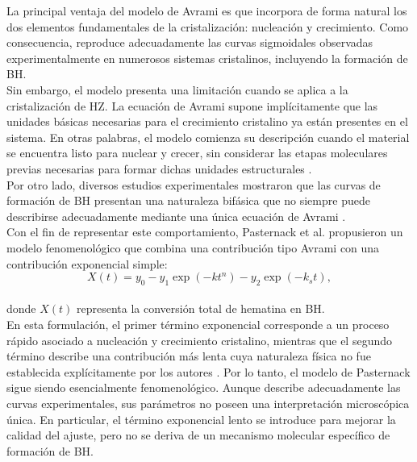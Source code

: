 \documentclass[12pt,letterpaper,oneside]{report}
\begin{document}
La principal ventaja del modelo de Avrami es que incorpora de forma natural los dos elementos fundamentales de la cristalización: nucleación y crecimiento. Como consecuencia, reproduce adecuadamente las curvas sigmoidales observadas experimentalmente en numerosos sistemas cristalinos, incluyendo la formación de BH.\\

Sin embargo, el modelo presenta una limitación cuando se aplica a la cristalización de HZ. La ecuación de Avrami supone implícitamente que las unidades básicas necesarias para el crecimiento cristalino ya están presentes en el sistema. En otras palabras, el modelo comienza su descripción cuando el material se encuentra listo para nuclear y crecer, sin considerar las etapas moleculares previas necesarias para formar dichas unidades estructurales \cite{AlirioParra2023}.\\%

Por otro lado, diversos estudios experimentales mostraron que las curvas de formación de BH presentan una naturaleza bifásica que no siempre puede describirse adecuadamente mediante una única ecuación de Avrami \cite{Pasternack1993}.\\

Con el fin de representar este comportamiento, Pasternack et al. propusieron un modelo fenomenológico que combina una contribución tipo Avrami con una contribución exponencial simple:\\

\begin{equation}
X(t)
=
y_0
-
y_1
\exp\left(-kt^{n}\right)
-
y_2
\exp\left(-k_s t\right),
\label{eq:pasternack}
\end{equation}\\

\noindent donde $X(t)$ representa la conversión total de hematina en BH.\\

En esta formulación, el primer término exponencial corresponde a un proceso rápido asociado a nucleación y crecimiento cristalino, mientras que el segundo término describe una contribución más lenta cuya naturaleza física no fue establecida explícitamente por los autores \cite{Pasternack1993}. Por lo tanto, el modelo de Pasternack sigue siendo esencialmente fenomenológico. Aunque describe adecuadamente las curvas experimentales, sus parámetros no poseen una interpretación microscópica única. En particular, el término exponencial lento se introduce para mejorar la calidad del ajuste, pero no se deriva de un mecanismo molecular específico de formación de BH.\\
\end{document}
